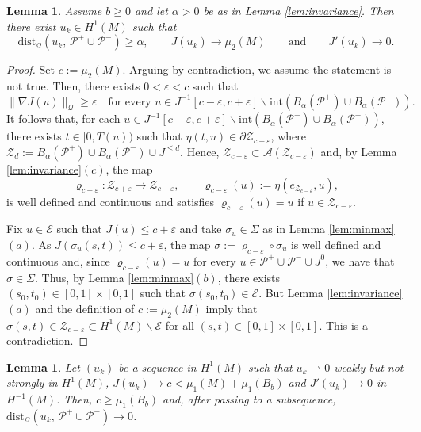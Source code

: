 \documentclass[reqno,11pt,oneside]{amsart}
\newtheorem{lemma}[theorem]{Lemma}
\numberwithin{equation}{section}
\def\eps{\varepsilon}
\def\rh{\rightharpoonup}
\def\vr{\varrho}
\def\cA{\mathcal{A}}
\def\cE{\mathcal{E}}
\def\cP{\mathcal{P}}
\def\cZ{\mathcal{Z}}
\def\dist{\mathrm{dist}}
\begin{document}
\begin{lemma} \label{lem:ps_sequence}
Assume $b\geq 0$ and let $\alpha>0$ be as in \emph{Lemma \ref{lem:invariance}}. Then there exist $u_k\in H^1(M)$ such that 
$$\dist_\mathscr{Q}(u_k,\,\cP^+\cup\cP^-)\geq\alpha, \qquad J(u_k)\to\mu_2(M)\qquad\text{and}\qquad J'(u_k)\to 0.$$
\end{lemma}

\begin{proof}
Set $c:=\mu_2(M)$. Arguing by contradiction, we assume the statement is not true. Then, there exists $0<\eps<c$ such that
\begin{equation}
\|\nabla J(u)\|_\mathscr{Q}\geq \eps\quad\text{for every \ }u\in J^{-1}[c-\eps,c+\eps]\smallsetminus \mathrm{int}(B_\alpha(\cP^+)\cup B_\alpha(\cP^-)).  
\end{equation}
It follows that, for each $u\in J^{-1}[c-\eps,c+\eps]\smallsetminus \mathrm{int}(B_\alpha(\cP^+)\cup B_\alpha(\cP^-))$, there exists $t\in[0,T(u))$ such that 
$\eta(t,u)\in\partial\cZ_{c-\eps}$, where $\cZ_d:=B_\alpha(\cP^+)\cup B_\alpha(\cP^-)\cup J^{\leq d}$. Hence, $\cZ_{c+\eps}\subset\cA(\cZ_{c-\eps})$ and, by Lemma \ref{lem:invariance}$(c)$, the map
$$\vr_{c-\eps}:\cZ_{c+\eps}\to\cZ_{c-\eps},\qquad \vr_{c-\eps}(u):=\eta(e_{\cZ_{c-\eps}},u),$$
is well defined and continuous and satisfies $\vr_{c-\eps}(u)=u$ if $u\in\cZ_{c-\eps}$.

Fix $u\in\cE$ such that $J(u)\leq c+\eps$ and take $\sigma_u\in \Sigma$ as in Lemma \ref{lem:minmax}$(a)$. As $J(\sigma_u(s,t))\leq c+\eps$, the map $\sigma:=\vr_{c-\eps}\circ\sigma_u$ is well defined and continuous and, since $\vr_{c-\eps}(u)=u$ for every $u\in\cP^+\cup \cP^-\cup J^0$, we have that $\sigma\in\Sigma$. Thus, by Lemma \ref{lem:minmax}$(b)$, there exists $(s_0,t_0)\in[0,1]\times[0,1]$ such that $\sigma(s_0,t_0)\in\cE$. But Lemma \ref{lem:invariance}$(a)$ and the definition of $c:=\mu_2(M)$ imply that $\sigma(s,t)\in\cZ_{c-\eps}\subset H^1(M)\smallsetminus\cE$ for all $(s,t)\in [0,1]\times[0,1]$. This is a contradiction. 
\end{proof}

\begin{lemma} \label{lem:hl}
Let $(u_k)$ be a sequence in $H^1(M)$ such that $u_k\rh 0$ weakly but not strongly in $H^1(M)$, $J(u_k)\to c<\mu_1(M)+\mu_1(B_b)$ and $J'(u_k)\to 0$ in $H^{-1}(M)$. Then, $c\geq\mu_1(B_b)$ and, after passing to a subsequence, $\dist_\mathscr{Q}(u_k,\,\cP^+\cup\cP^-)\to0$.
\end{lemma}
\end{document}
